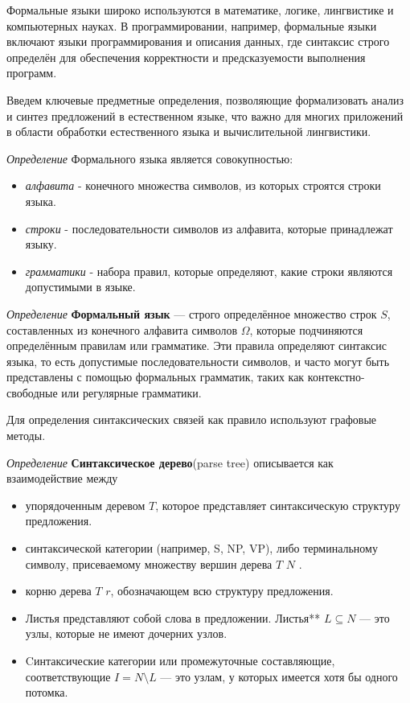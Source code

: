 Формальные языки широко используются в математике, логике, лингвистике и компьютерных науках. 
В программировании, например, формальные языки включают языки программирования и описания данных, 
где синтаксис строго определён для обеспечения корректности и предсказуемости выполнения программ.

Введем ключевые предметные определения, позволяющие формализовать анализ и 
синтез предложений в естественном языке, что важно для многих приложений 
в области обработки естественного языка и вычислительной лингвистики.
 
\textit{Определение} Формального языка является совокупностью:
\begin{itemize}
    \item \textit{алфавита} - конечного множества символов, из которых строятся строки языка.
    \item \textit{строки} - последовательности символов из алфавита, которые принадлежат языку.
    \item \textit{грамматики} - набора правил, которые определяют, какие строки являются допустимыми в языке.
\end{itemize}

\textit{Определение} \textbf{Формальный язык} — строго определённое множество строк $S$, составленных из конечного алфавита символов $\Omega$,
 которые подчиняются определённым правилам или грамматике.
Эти правила определяют синтаксис языка, то есть допустимые последовательности символов,
 и часто могут быть представлены с помощью формальных грамматик, таких как контекстно-свободные или регулярные грамматики.

Для определения синтаксических связей как правило используют графовые методы.

\textit{Определение} \textbf{Синтаксическое дерево}(parse tree) описывается как взаимодействие между \begin{itemize}
    \item упорядоченным деревом $T$, которое представляет синтаксическую структуру предложения.
    \item синтаксической категории (например, S, NP, VP), либо терминальному символу, присеваемому множеству вершин дерева $T$ $N$ . 
    \item корню дерева $T$  $r$, обозначающем всю структуру предложения. 
    \item Листья представляют собой слова в предложении. Листья** $L \subseteq N$ — это узлы, которые не имеют дочерних узлов. 
    \item Cинтаксические категории или промежуточные составляющие, соответствующие $I = N \setminus L$ — это узлам, у которых имеется хотя бы одного потомка. 
\end{itemize}

